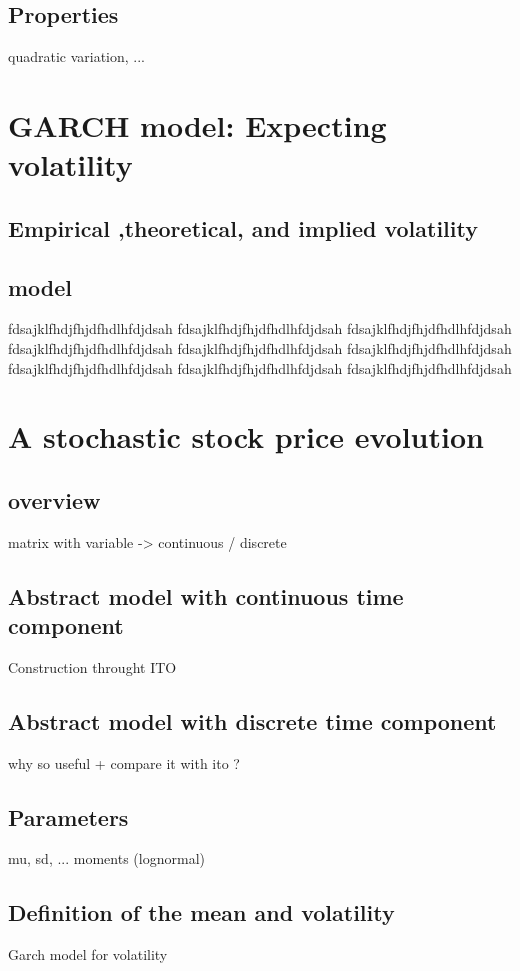 \documentclass[12pt]{report}
\begin{document}
\subsection{Properties}
quadratic variation, ...

\section{GARCH model: Expecting volatility}
\subsection{Empirical ,theoretical, and implied volatility}
\subsection{model}

fdsajklfhdjfhjdfhdlhfdjdsah
fdsajklfhdjfhjdfhdlhfdjdsah
fdsajklfhdjfhjdfhdlhfdjdsah
fdsajklfhdjfhjdfhdlhfdjdsah
fdsajklfhdjfhjdfhdlhfdjdsah
fdsajklfhdjfhjdfhdlhfdjdsah
fdsajklfhdjfhjdfhdlhfdjdsah
fdsajklfhdjfhjdfhdlhfdjdsah
fdsajklfhdjfhjdfhdlhfdjdsah

\section{A stochastic stock price evolution}
\subsection{overview}
matrix with variable -> continuous / discrete
% 
\subsection{Abstract model with continuous time component}
Construction throught ITO
\subsection{Abstract model with discrete time component}
why so useful + compare it with ito ?

\subsection{Parameters}
mu, sd, ... moments (lognormal)

\subsection{Definition of the mean and volatility}
Garch model for volatility
\end{document}
